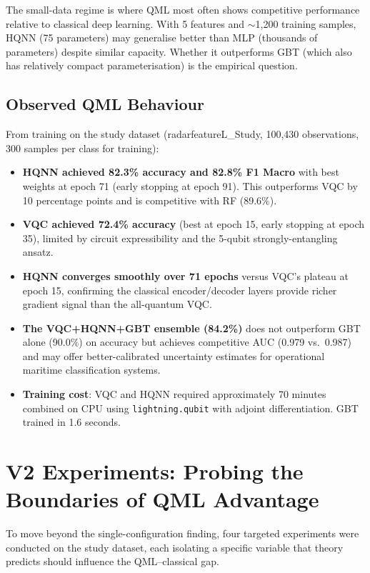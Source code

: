 \documentclass[journal]{IEEEtran}
\begin{document}
The small-data regime is where QML most often shows competitive performance
relative to classical deep learning. With 5 features and $\sim$1,200 training
samples, HQNN (75 parameters) may generalise better than MLP (thousands of
parameters) despite similar capacity. Whether it outperforms GBT (which also
has relatively compact parameterisation) is the empirical question.

\subsection{Observed QML Behaviour}

From training on the study dataset (radarfeatureL\_Study, 100,430 observations,
300 samples per class for training):
\begin{itemize}
  \item \textbf{HQNN achieved 82.3\% accuracy and 82.8\% F1 Macro} with best
        weights at epoch 71 (early stopping at epoch 91). This outperforms
        VQC by 10 percentage points and is competitive with RF (89.6\%).
  \item \textbf{VQC achieved 72.4\% accuracy} (best at epoch 15, early stopping
        at epoch 35), limited by circuit expressibility and the 5-qubit
        strongly-entangling ansatz.
  \item \textbf{HQNN converges smoothly over 71 epochs} versus VQC's plateau
        at epoch 15, confirming the classical encoder/decoder layers provide
        richer gradient signal than the all-quantum VQC.
  \item \textbf{The VQC+HQNN+GBT ensemble (84.2\%)} does not outperform GBT
        alone (90.0\%) on accuracy but achieves competitive AUC (0.979 vs.\
        0.987) and may offer better-calibrated uncertainty estimates for
        operational maritime classification systems.
  \item \textbf{Training cost}: VQC and HQNN required approximately 70 minutes
        combined on CPU using \texttt{lightning.qubit} with adjoint
        differentiation. GBT trained in 1.6 seconds.
\end{itemize}

\section{V2 Experiments: Probing the Boundaries of QML Advantage}
\label{sec:v2experiments}

To move beyond the single-configuration finding, four targeted experiments
were conducted on the study dataset, each isolating a specific variable
that theory predicts should influence the QML--classical gap.
\end{document}
